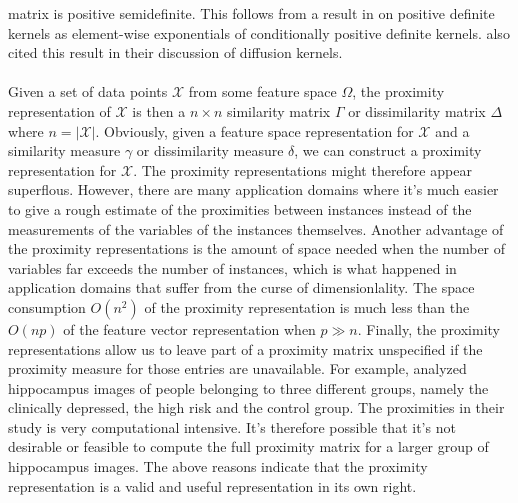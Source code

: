 matrix is positive semidefinite. This follows from a result in
\citet{schoenberg38:_metric_spaces_compl_monot_funct} on
positive definite kernels as element-wise exponentials of
conditionally positive definite kernels. \citet{kondor02:_diffus}
also cited this result in their discussion of diffusion kernels.
\\ \\
%
%
\noindent
Given a set of data points $\mathcal{X}$ from some feature space
$\Omega$, the proximity representation of $\mathcal{X}$ is then a $n
\times n$ similarity matrix $\Gamma$ or dissimilarity matrix $\Delta$
where $n = | \mathcal{X}|$. Obviously, given a feature space
representation for $\mathcal{X}$ and a similarity measure $\gamma$ or
dissimilarity measure $\delta$, we can construct a proximity
representation for $\mathcal{X}$. The proximity representations might
therefore appear superflous. However, there are many application
domains where it's much easier to give a rough estimate of the
proximities between instances instead of the measurements of the
variables of the instances themselves. Another advantage of the
proximity representations is the amount of space needed when the
number of variables far exceeds the number of instances, which is what
happened in application domains that suffer from the curse of
dimensionlality. The space consumption $O(n^2)$ of the proximity
representation is much less than the $O(np)$ of the feature vector
representation when $p \gg n$. Finally, the proximity representations
allow us to leave part of a proximity matrix unspecified if the
proximity measure for those entries are unavailable. For example,
\citet{park07:_hippoc} analyzed hippocampus images of people belonging
to three different groups, namely the clinically depressed, the high
risk and the control group. The proximities in their study is very
computational intensive. It's therefore possible that it's not
desirable or feasible to compute the full proximity matrix for a
larger group of hippocampus images. The above
reasons indicate that the proximity representation is a valid and
useful representation in its own right.
